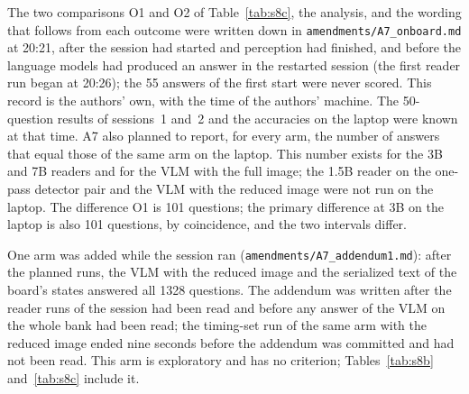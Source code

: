 \documentclass[10pt]{article}
\begin{document}
The two comparisons O1 and O2 of Table~\ref{tab:s8c}, the analysis, and the wording that follows from each outcome were written down in \texttt{amendments/A7\_onboard.md} at 20:21, after the session had started and perception had finished, and before the language models had produced an answer in the restarted session (the first reader run began at 20:26); the 55 answers of the first start were never scored. This record is the authors' own, with the time of the authors' machine. The 50-question results of sessions~1 and~2 and the accuracies on the laptop were known at that time. A7 also planned to report, for every arm, the number of answers that equal those of the same arm on the laptop. This number exists for the 3B and 7B readers and for the VLM with the full image; the 1.5B reader on the one-pass detector pair and the VLM with the reduced image were not run on the laptop. The difference O1 is 101 questions; the primary difference at 3B on the laptop is also 101 questions, by coincidence, and the two intervals differ.

One arm was added while the session ran (\texttt{amendments/A7\_addendum1.md}): after the planned runs, the VLM with the reduced image and the serialized text of the board's states answered all 1328 questions. The addendum was written after the reader runs of the session had been read and before any answer of the VLM on the whole bank had been read; the timing-set run of the same arm with the reduced image ended nine seconds before the addendum was committed and had not been read. This arm is exploratory and has no criterion; Tables~\ref{tab:s8b} and~\ref{tab:s8c} include it.
\end{document}
